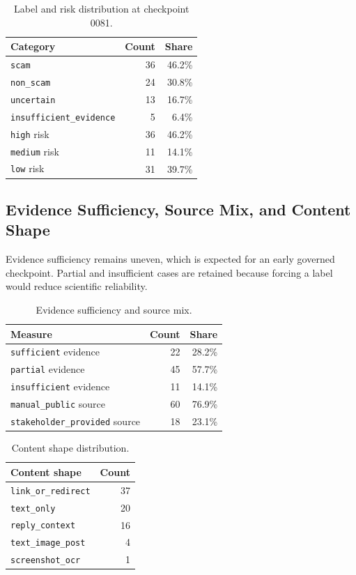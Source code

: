 \documentclass[11pt]{article}
\begin{document}
\begin{table}[h]
\centering
\caption{Label and risk distribution at checkpoint 0081.}
\label{tab:label-risk}
\begin{tabularx}{0.82\textwidth}{@{}Yrr@{}}
\toprule
Category & Count & Share \\
\midrule
\texttt{scam} & 36 & 46.2\% \\
\texttt{non\_scam} & 24 & 30.8\% \\
\texttt{uncertain} & 13 & 16.7\% \\
\texttt{insufficient\_evidence} & 5 & 6.4\% \\
\midrule
\texttt{high} risk & 36 & 46.2\% \\
\texttt{medium} risk & 11 & 14.1\% \\
\texttt{low} risk & 31 & 39.7\% \\
\bottomrule
\end{tabularx}
\end{table}

\subsection{Evidence Sufficiency, Source Mix, and Content Shape}

Evidence sufficiency remains uneven, which is expected for an early governed checkpoint.
Partial and insufficient cases are retained because forcing a label would reduce scientific reliability.

\begin{table}[h]
\centering
\caption{Evidence sufficiency and source mix.}
\begin{tabularx}{0.82\textwidth}{@{}Yrr@{}}
\toprule
Measure & Count & Share \\
\midrule
\texttt{sufficient} evidence & 22 & 28.2\% \\
\texttt{partial} evidence & 45 & 57.7\% \\
\texttt{insufficient} evidence & 11 & 14.1\% \\
\midrule
\texttt{manual\_public} source & 60 & 76.9\% \\
\texttt{stakeholder\_provided} source & 18 & 23.1\% \\
\bottomrule
\end{tabularx}
\end{table}

\begin{table}[h]
\centering
\caption{Content shape distribution.}
\begin{tabularx}{0.68\textwidth}{@{}Yr@{}}
\toprule
Content shape & Count \\
\midrule
\texttt{link\_or\_redirect} & 37 \\
\texttt{text\_only} & 20 \\
\texttt{reply\_context} & 16 \\
\texttt{text\_image\_post} & 4 \\
\texttt{screenshot\_ocr} & 1 \\
\bottomrule
\end{tabularx}
\end{table}
\end{document}
